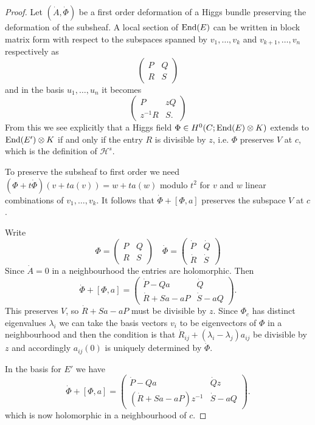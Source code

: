 \documentclass[12pt]{article}
\numberwithin{equation}{section}
\theoremstyle{remark}
\theoremstyle{definition}
\numberwithin{theorem}{section}
\def\calH{\mathcal{H}}
\newcommand{\End}{\textnormal{End}}
\renewcommand{\1}{\mathbbm{1}}
\begin{document}
\begin{proof}
	
	Let $(\dot A,\dot\Phi)$ be a first order deformation of a Higgs bundle preserving the deformation of the subsheaf.   
	A  local section of $\End (E)$ can be written in block matrix form with respect to the subspaces  spanned by $v_1,\dots, v_k$ and $v_{k+1},\dots, v_n$ respectively as
	$$\begin{pmatrix}  P & Q\\
	R & S\end{pmatrix} $$ and  in the basis $u_1,\dots, u_n$ it becomes 
	\begin{equation}
	\begin{pmatrix}  P & zQ\\
	z^{-1}R & S .\end{pmatrix}
	\label{matrix1}
	\end{equation} 
	From this we see explicitly that  a Higgs field $\Phi\in H^0(C;\End (E)\otimes K)$  extends to $\End (E')\otimes K$ if  and only if  the entry $R$ is divisible by $z$, i.e. $\Phi$ preserves $V$ at $c$, which is the definition of $\calH^s$.
	
	
	
	
	
	To preserve the subsheaf to first order we need 
	$(\Phi+t\dot\Phi)(v+ta(v))=w+ta(w)$ modulo $t^2$ 
	for $v$ and $w$ linear combinations of  $v_1,\dots,v_k$. It follows that  $\dot\Phi+[\Phi,a]$ preserves the subspace $V$ at $c$.
	
	
	Write $$\Phi=\begin{pmatrix}  P & Q\\
	R & S\end{pmatrix}\quad \dot\Phi=\begin{pmatrix}  \dot P & \dot Q\\
	\dot R & \dot S\end{pmatrix}$$
	Since $\dot A=0$ in a neighbourhood the entries are holomorphic.  
	Then
	$$\dot\Phi+[\Phi,a]=\begin{pmatrix}  \dot P- Qa& \dot Q\\
	\dot R +Sa-aP& \dot S-aQ\end{pmatrix}.$$
	This  preserves $V$, so $\dot R +Sa-aP$ must be divisible by $z$.  Since $\Phi_c$ has distinct eigenvalues $\lambda_i$ we can take the basis vectors $v_i$ to be eigenvectors of $\Phi$ in a neighbourhood and then the condition is that 
	$\dot R_{ij}+(\lambda_i-\lambda_j)a_{ij}$ be divisible by $z$ and accordingly  $a_{ij}(0)$ is uniquely determined by $\dot \Phi$.
	
	In the basis for $E'$ we have  
	$$\dot\Phi+[\Phi,a]=\begin{pmatrix}  \dot P- Qa& \dot Q z\\
	(\dot R +Sa-aP)z^{-1}& \dot S-aQ\end{pmatrix}.$$
	which is now holomorphic in a neighbourhood of $c$.
	

\end{proof}
\end{document}
